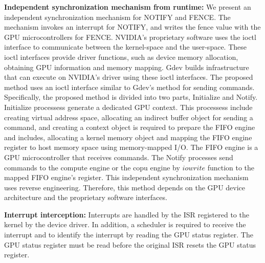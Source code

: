 \textbf{Independent synchronization mechanism from runtime:}
We present an independent synchronization mechanism for NOTIFY and FENCE.
The mechanism invokes an interrupt for NOTIFY, and writes the fence value with the GPU microcontrollers for FENCE.
NVIDIA’s proprietary software uses the ioctl interface to communicate between the kernel-space and the user-space.
These ioctl interfaces provide driver functions, such as device memory allocation, obtaining GPU information and memory mapping.
Gdev builds infrastructure that can execute on NVIDIA’s driver using these ioctl interfaces.
The proposed method uses an ioctl interface similar to Gdev’s method for sending commands.
Specifically, the proposed method is divided into two parts, Initialize and Notify.
Initialize processess generate a dedicated GPU context.
This processess include creating virtual address space, allocating an indirect buffer object for sending a command, and creating a context object is required to prepare the FIFO engine and includes, allocating a kernel memory object and mapping the FIFO engine register to host memory space using memory-mapped I/O.
The FIFO engine is a GPU microcontroller that receives commands.
The Notify processes send commands to the compute engine or the copu engine by $iowrite$ function to the mapped FIFO engine’s register.
This independent synchronization mechanism uses reverse engineering.
Therefore, this method depends on the GPU device architecture and the proprietary software interfaces.

\textbf{Interrupt interception:}
Interrupts are handled by the ISR registered to the kernel by the device driver.
In addition, a scheduler is required to receive the interrupt and to identify the interrupt by reading the GPU status register.
The GPU status register must be read before the original ISR resets the GPU status register.

